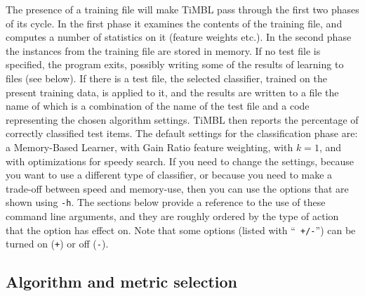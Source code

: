 \documentclass{report}
\begin{document}
The presence of a training file will make TiMBL pass through the first
two phases of its cycle. In the first phase it examines the contents
of the training file, and computes a number of statistics on it
(feature weights etc.). In the second phase the instances from the
training file are stored in memory. If no test file is specified, the
program exits, possibly writing some of the results of learning to
files (see below). If there is a test file, the selected classifier,
trained on the present training data, is applied to it, and the
results are written to a file the name of which is a combination of the
name of the test file and a code representing the chosen algorithm
settings. TiMBL then reports the percentage of correctly classified
test items. The default settings for the classification phase are: a
Memory-Based Learner, with Gain Ratio feature weighting, with $k=1$,
and with optimizations for speedy search. If you need to change the
settings, because you want to use a different type of classifier, or
because you need to make a trade-off between speed and memory-use,
then you can use the options that are shown using {\tt -h}. The
sections below provide a reference to the use of these command line
arguments, and they are roughly ordered by the type of action that the
option has effect on. Note that some options (listed with ``{\tt
+/-}'') can be turned on ({\tt +}) or off ({\tt -}).

\subsection{Algorithm and metric selection}
\end{document}
